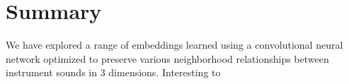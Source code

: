 \documentclass{article}
\begin{document}
\section{Summary}

We have explored a range of embeddings learned using a convolutional neural network optimized to preserve various neighborhood relationships between instrument sounds in 3 dimensions.
Interesting to









\end{document}
